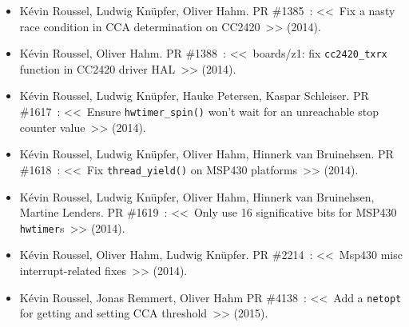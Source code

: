 \begin{itemize}
\item Kévin Roussel, Ludwig Knüpfer, Oliver Hahm.
PR \#1385~: <<~Fix a nasty race condition in CCA determination on CC2420~>>
(2014).

\item Kévin Roussel, Oliver Hahm.
PR \#1388~: <<~boards/z1: fix \texttt{cc2420\_txrx} function in CC2420
               driver HAL~>>
(2014).

\item Kévin Roussel, Ludwig Knüpfer, Hauke Petersen, Kaspar Schleiser.
PR \#1617~: <<~Ensure \texttt{hwtimer\_spin()} won't wait for
               an unreachable stop counter value~>>
(2014).

\item Kévin Roussel, Ludwig Knüpfer, Oliver Hahm, Hinnerk van Bruinehsen.
PR \#1618~: <<~Fix \texttt{thread\_yield()} on MSP430 platforms~>>
(2014).

\item Kévin Roussel, Ludwig Knüpfer, Oliver Hahm, Hinnerk van Bruinehsen,
      Martine Lenders.
PR \#1619~: <<~Only use 16 significative bits for MSP430 \texttt{hwtimer}s~>>
(2014).

\item Kévin Roussel, Oliver Hahm, Ludwig Knüpfer.
PR \#2214~: <<~Msp430 misc interrupt-related fixes~>>
(2014).

\item Kévin Roussel, Jonas Remmert, Oliver Hahm
PR \#4138~: <<~Add a \texttt{netopt} for getting and setting CCA threshold~>>
(2015).

\end{itemize}






